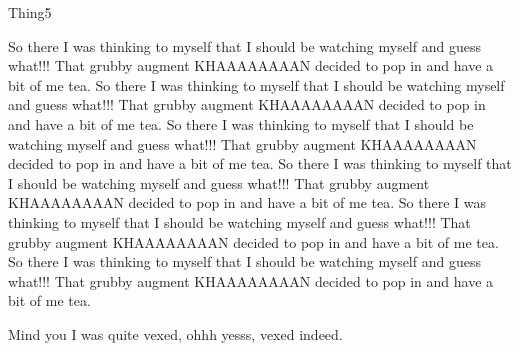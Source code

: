 \begin{define}{Thing5}

So there I was thinking to myself that I should be 
watching myself and guess what!!!
That grubby augment KHAAAAAAAAN decided to pop in and have a bit of
me tea. 
So there I was thinking to myself that I should be 
watching myself and guess what!!!
That grubby augment KHAAAAAAAAN decided to pop in and have a bit of
me tea. So there I was thinking to myself that I should be 
watching myself and guess what!!!
That grubby augment KHAAAAAAAAN decided to pop in and have a bit of
me tea. So there I was thinking to myself that I should be 
watching myself and guess what!!!
That grubby augment KHAAAAAAAAN decided to pop in and have a bit of
me tea. 
So there I was thinking to myself that I should be 
watching myself and guess what!!!
That grubby augment KHAAAAAAAAN decided to pop in and have a bit of
me tea. So there I was thinking to myself that I should be 
watching myself and guess what!!!
That grubby augment KHAAAAAAAAN decided to pop in and have a bit of
me tea. 

Mind you I was quite vexed, ohhh yesss, vexed indeed.   

\end{define}